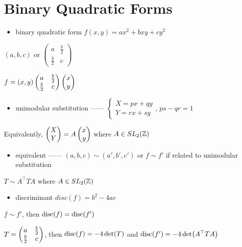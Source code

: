 \section{Binary Quadratic Forms}\label{sec:binary-quadratic-forms}

\begin{itemize}
    \item binary quadratic form $f(x, y) = ax^2 + bxy + cy^2$
\end{itemize}
\begin{notation}
    $(a, b, c)$ or $\begin{pmatrix}
                        a & \frac{b}{2} \\
                        \frac{b}{2} & c
    \end{pmatrix}$
\end{notation}
\begin{fact}
    $f = \left( x, y \right)\begin{pmatrix} a & \frac{b}{2} \\ \frac{b}{2} & c \end{pmatrix}\begin{pmatrix} x \\ y \end{pmatrix}$
\end{fact}

\begin{itemize}
    \item unimodular substitution ------ $\begin{cases}
                                              X = px + qy\\
                                              Y = rx + sy
    \end{cases}$, $ps - qr = 1$
\end{itemize}
\begin{fact}
    Equivalently, $\begin{pmatrix} X \\ Y \end{pmatrix} = A\begin{pmatrix} x \\ y \end{pmatrix}$ where $A \in SL_2(\mathbb{Z})$
\end{fact}

\begin{itemize}
    \item equivalent ------ $(a, b, c) \sim (a', b', c')$ or $f \sim f'$ if related to unimodular substitution
\end{itemize}
\begin{fact}
    $T \sim A^{\top}TA$ where $A \in SL_2(\mathbb{Z})$
\end{fact}

\begin{itemize}
    \item discriminant $disc(f) = b^2 - 4ac$
\end{itemize}

\begin{lemma}
    $f \sim f'$, then $\textnormal{disc}(f) = \textnormal{disc}(f')$
\end{lemma}
\begin{pf}
    $T = \begin{pmatrix} a & \frac{b}{2} \\ \frac{b}{2} & c \end{pmatrix}$, then $\textnormal{disc}(f) = -4\det(T)$ and $\textnormal{disc}(f') = -4\det(A^\top T A)$
\end{pf}

